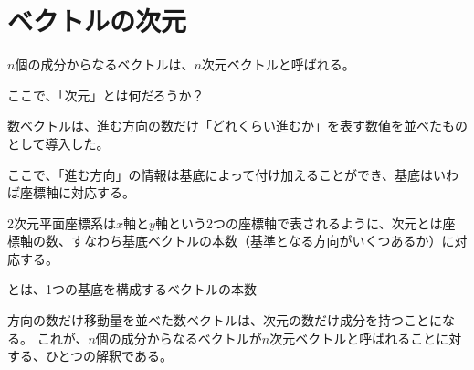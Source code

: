 \documentclass[../../../topic_linear-algebra]{subfiles}
\begin{document}
\sectionline
\section{ベクトルの次元}

$n$個の成分からなるベクトルは、$n$次元ベクトルと呼ばれる。

ここで、「次元」とは何だろうか？

\br

数ベクトルは、進む方向の数だけ「どれくらい進むか」を表す数値を並べたものとして導入した。

ここで、「進む方向」の情報は基底によって付け加えることができ、基底はいわば座標軸に対応する。

\br

2次元平面座標系は$x$軸と$y$軸という2つの座標軸で表されるように、次元とは座標軸の数、すなわち基底ベクトルの本数（基準となる方向がいくつあるか）に対応する。

\begin{emphabox}
  \begin{spacebox}
    \begin{center}
      とは、1つの基底を構成するベクトルの本数
    \end{center}
  \end{spacebox}
\end{emphabox}

方向の数だけ移動量を並べた数ベクトルは、次元の数だけ成分を持つことになる。
これが、$n$個の成分からなるベクトルが$n$次元ベクトルと呼ばれることに対する、ひとつの解釈である。
\end{document}
